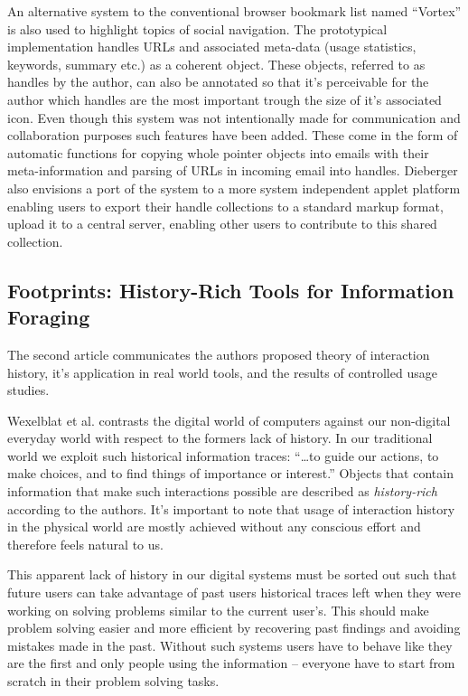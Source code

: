 \documentclass[12pt,a4paper]{article}
\begin{document}
An alternative system to the conventional browser bookmark list
named ``Vortex'' is also used to highlight topics of social navigation. The
prototypical implementation handles URLs and associated meta-data (usage
statistics, keywords, summary etc.) as a coherent object. These objects,
referred to as handles by the author, can also be annotated so that it's
perceivable for the author which handles are the most important trough the
size of it's associated icon. Even though this system was not intentionally
made for communication and collaboration purposes such features have been
added. These come in the form of automatic functions for copying whole
pointer objects into emails with their meta-information and parsing of
URLs in incoming email into handles. Dieberger also envisions a port of
the system to a more system independent applet platform enabling users to
export their handle collections to a standard markup format, upload it to
a central server, enabling other users to contribute to this
shared collection.

\subsection{Footprints: History-Rich Tools for Information Foraging}

The second article \cite{wexelblat99} communicates the authors proposed theory
of interaction history, it's application in real world tools, and the results
of controlled usage studies. 

Wexelblat et al. contrasts the digital world of computers against our
non-digital everyday world with respect to the formers lack of history. In our
traditional world we exploit such historical information traces:
``\ldots to guide our actions, to make choices, and to find things of
importance or interest.'' \cite{wexelblat99}
Objects that contain information that make such interactions possible are
described as \emph{history-rich} according to the authors. It's important to
note that usage of interaction history in the physical world are mostly
achieved without any conscious effort and therefore feels natural to us.

This apparent lack of history in our digital systems must be sorted out such
that future users can take advantage of past users historical traces left when
they were working on solving problems similar to the current user's. This
should make problem solving easier and more efficient by recovering past
findings and avoiding mistakes made in the past. Without such systems users
have to behave like they are the first and only people using the information
-- everyone have to start from scratch in their problem solving tasks.
\end{document}
